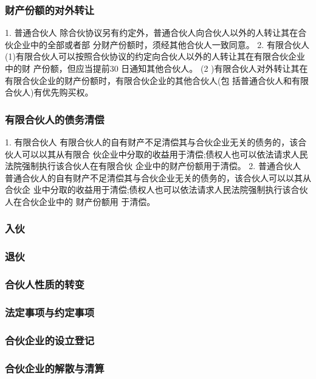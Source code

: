 \documentclass[UTF8,12pt]{ctexart}
\numberwithin{equation}{section} %
\numberwithin{figure}{section}
\numberwithin{table}{section}
\begin{document}
	\subsubsection{财产份额的对外转让}
	1. 普通合伙人 除合伙协议另有约定外，普通合伙人向合伙人以外的人转让其在合伙企业中的全部或者部 分财产份额时，须经其他合伙人一致同意。
	2. 有限合伙人 (1)有限合伙人可以按照合伙协议的约定向合伙人以外的人转让其在有限合伙企业中的财 产份额，但应当提前30 日通知其他合伙人。
	(2 )有限合伙人对外转让其在有限合伙企业的财产份额时，有限合伙企业的其他合伙人(包 括普通合伙人和有限合伙人)有优先购买权。
	
	
	\subsubsection{有限合伙人的债务清偿}
	
	
	1. 有限合伙人 有限合伙人的自有财产不足清偿其与合伙企业无关的债务的，该合伙人可以以其从有限合 伙企业中分取的收益用于清偿;债权人也可以依法请求人民法院强制执行该合伙人在有限合伙 企业中的财产份额用于清偿。
	2. 普通合伙人 普通合伙人的自有财产不足清偿其与合伙企业无关的债务的，该合伙人可以以其从合伙企 业中分取的收益用于清偿;债权人也可以依法请求人民法院强制执行该合伙人在合伙企业中的 财产份额用 于清偿。
	
	
	\subsubsection{入伙}
	
	\subsubsection{退伙}
	
	\subsubsection{合伙人性质的转变}
	
	\subsubsection{法定事项与约定事项}
	
	\subsubsection{合伙企业的设立登记}
	
	\subsubsection{合伙企业的解散与清算}
	
\end{document}
